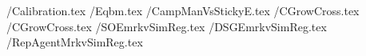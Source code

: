 \documentclass{\econtex}\usepackage{\econtexSetup}\usepackage{\econtexShortcuts}\newcommand{\texname}{Tables}
\begin{document}


 \TabsDir/Calibration.tex
 \TabsDir/Eqbm.tex
 \TabsDir/CampManVsStickyE.tex
 \eq/CGrowCross.tex %
 \TabsDir/CGrowCross.tex
 \TabsDir/SOEmrkvSimReg.tex
 \TabsDir/DSGEmrkvSimReg.tex
 \TabsDir/RepAgentMrkvSimReg.tex


\end{document}
